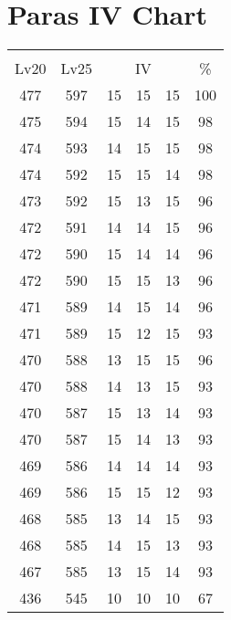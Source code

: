 \documentclass{article}%
\begin{document}
%
\normalsize%
\section{Paras IV Chart}%
\label{sec:Paras IV Chart}%
\renewcommand{\arraystretch}{1.5}%
\begin{tabular}{|c|c|c|c|c|c|}%
\hline%
\multicolumn{6}{|c|}{\textcolor{white}{ 
\linebreak{Paras}
}%
\cellcolor{black}}\\%
\multicolumn{1}{|c}{Lv20}&\multicolumn{1}{c|}{Lv25}&\multicolumn{3}{c|}{IV}&\multicolumn{1}{|c|}{\%}\\%
\hline%
\rowcolor{color100}%
477&597&15&15&15&100\\%
\hline%
\rowcolor{color98}%
475&594&15&14&15&98\\%
\hline%
\rowcolor{color98}%
474&593&14&15&15&98\\%
\hline%
\rowcolor{color98}%
474&592&15&15&14&98\\%
\hline%
\rowcolor{color96}%
473&592&15&13&15&96\\%
\hline%
\rowcolor{color96}%
472&591&14&14&15&96\\%
\hline%
\rowcolor{color96}%
472&590&15&14&14&96\\%
\hline%
\rowcolor{color96}%
472&590&15&15&13&96\\%
\hline%
\rowcolor{color96}%
471&589&14&15&14&96\\%
\hline%
\rowcolor{color93}%
471&589&15&12&15&93\\%
\hline%
\rowcolor{color96}%
470&588&13&15&15&96\\%
\hline%
\rowcolor{color93}%
470&588&14&13&15&93\\%
\hline%
\rowcolor{color93}%
470&587&15&13&14&93\\%
\hline%
\rowcolor{color93}%
470&587&15&14&13&93\\%
\hline%
\rowcolor{color93}%
469&586&14&14&14&93\\%
\hline%
\rowcolor{color93}%
469&586&15&15&12&93\\%
\hline%
\rowcolor{color93}%
468&585&13&14&15&93\\%
\hline%
\rowcolor{color93}%
468&585&14&15&13&93\\%
\hline%
\rowcolor{color93}%
467&585&13&15&14&93\\%
\hline%
\rowcolor{color91}%
436&545&10&10&10&67\\%
\end{tabular}

%
\end{document}
